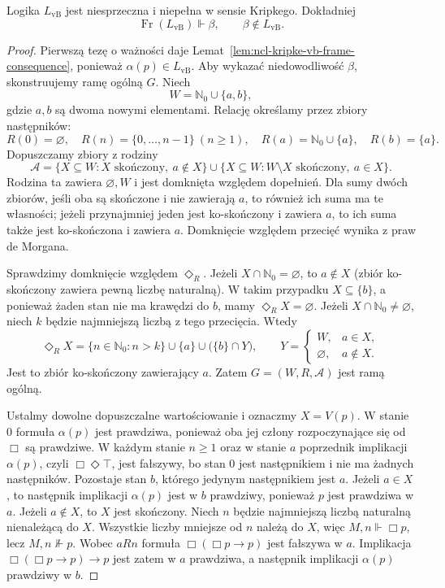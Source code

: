 \begin{twierdzenie}
\label{thm:ncl-kripke-vb-incompleteness}
Logika $L_{\mathrm{vB}}$ jest niesprzeczna
i niepełna w sensie Kripkego. Dokładniej
\[
 \operatorname{Fr}(L_{\mathrm{vB}})\Vdash\beta,
 \qquad \beta\notin L_{\mathrm{vB}}.
\]
\end{twierdzenie}
\begin{proof}
Pierwszą tezę o ważności daje
Lemat~\ref{lem:ncl-kripke-vb-frame-consequence},
ponieważ $\alpha(p)\in L_{\mathrm{vB}}$.
Aby wykazać niedowodliwość $\beta$,
skonstruujemy ramę ogólną $G$.
Niech
\[
 W=\mathbb N_0\cup\{a,b\},
\]
gdzie $a,b$ są dwoma nowymi elementami.
Relację określamy przez zbiory następników:
\[
 R(0)=\varnothing,\quad
 R(n)=\{0,\ldots,n-1\}\ (n\geq1),\quad
 R(a)=\mathbb N_0\cup\{a\},\quad R(b)=\{a\}.
\]
Dopuszczamy zbiory z rodziny
\[
 \mathcal A=
 \{X\subseteq W:X\text{ skończony},\ a\notin X\}
 \cup
 \{X\subseteq W:W\setminus X\text{ skończony},
                       \ a\in X\}.
\]
Rodzina ta zawiera $\varnothing,W$ i jest
domknięta względem dopełnień. Dla sumy dwóch
zbiorów, jeśli oba są skończone i nie zawierają
$a$, to również ich suma ma te własności;
jeżeli przynajmniej jeden jest ko-skończony
i zawiera $a$, to ich suma także jest
ko-skończona i zawiera $a$. Domknięcie
względem przecięć wynika z praw de Morgana.

Sprawdzimy domknięcie względem $\Diamond_R$.
Jeżeli $X\cap\mathbb N_0=\varnothing$,
to $a\notin X$ (zbiór ko-skończony zawiera
pewną liczbę naturalną). W takim przypadku
$X\subseteq\{b\}$, a ponieważ żaden stan
nie ma krawędzi do $b$, mamy
$\Diamond_R X=\varnothing$.
Jeżeli $X\cap\mathbb N_0\ne\varnothing$,
niech $k$ będzie najmniejszą liczbą z tego
przecięcia. Wtedy
\[
 \Diamond_R X=\{n\in\mathbb N_0:n>k\}\cup\{a\}
                 \cup \bigl(\{b\}\cap Y\bigr),
 \qquad
 Y=\begin{cases}
 W,&a\in X,\\
 \varnothing,&a\notin X.
 \end{cases}
\]
Jest to zbiór ko-skończony zawierający $a$.
Zatem $G=(W,R,\mathcal A)$ jest ramą ogólną.

Ustalmy dowolne dopuszczalne wartościowanie
i oznaczmy $X=V(p)$.
W stanie $0$ formuła $\alpha(p)$ jest
prawdziwa, ponieważ oba jej człony
rozpoczynające się od $\Box$ są prawdziwe.
W każdym stanie $n\geq1$ oraz w stanie $a$
poprzednik implikacji $\alpha(p)$, czyli
$\Box\Diamond\top$, jest fałszywy,
bo stan $0$ jest następnikiem i nie ma
żadnych następników.
Pozostaje stan $b$, którego jedynym
następnikiem jest $a$.
Jeżeli $a\in X$, to następnik implikacji $\alpha(p)$
jest w $b$ prawdziwy, ponieważ $p$ jest
prawdziwa w $a$.
Jeżeli $a\notin X$, to $X$ jest skończony.
Niech $n$ będzie najmniejszą liczbą naturalną
nienależącą do $X$. Wszystkie liczby mniejsze
od $n$ należą do $X$, więc
$M,n\Vdash\Box p$, lecz $M,n\not\Vdash p$.
Wobec $aRn$ formuła $\Box(\Box p\to p)$
jest fałszywa w $a$.
Implikacja $\Box(\Box p\to p)\to p$
jest zatem w $a$ prawdziwa, a następnik implikacji
$\alpha(p)$ prawdziwy w $b$.


\end{proof}
